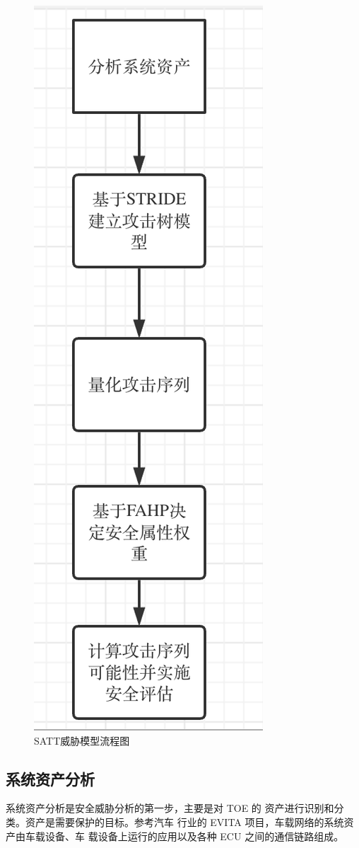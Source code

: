 \begin{figure}
    \centering
    \includegraphics[scale=0.5]{resources/img/a13.png}
    \caption{SATT威胁模型流程图}
  \end{figure}
\subsection{系统资产分析}
系统资产分析是安全威胁分析的第一步，主要是对 TOE 的
资产进行识别和分类。资产是需要保护的目标。参考汽车
行业的 EVITA 项目，车载网络的系统资产由车载设备、车
载设备上运行的应用以及各种 ECU 之间的通信链路组成\cite{ruddle2009deliverable}。
